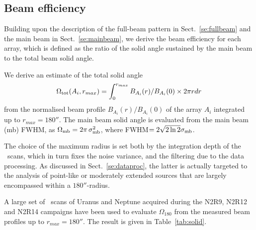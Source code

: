 \subsection{Beam efficiency}
\label{se:beam_efficiency}

Building upon the description of the full-beam pattern in
Sect.~\ref{se:fullbeam} and the main beam in Sect.~\ref{se:mainbeam},
we derive the beam efficiency for each array, which is defined as the
ratio of the solid angle sustained by the main beam to the total beam
solid angle.

We derive an estimate of the total solid angle
\begin{equation}
  \Omega_{\rm{tot}} (A_i, r_{max}) = \int_0^{r_{max}} B_{A_i}(r)/B_{A_i}(0) \times 2 \pi r dr
  \label{eq:omega_tot}
\end{equation}
from the normalised beam profile $B_{A_i}(r)/B_{A_i}(0)$ of the array
$A_i$ integrated up to $r_{max} = 180''$. The main beam solid angle is
evaluated from the main beam (mb) FWHM, as
$\Omega_{\rm{mb}} = 2 \pi\,  \sigma_{\rm{mb}}^2$, where FWHM$ =
2\sqrt{2\ln{2}}\sigma_{\rm{mb}}$. 

The choice of the maximum radius is set both by the integration depth of
the \bm\ scans, which in turn fixes the noise variance, and the
filtering due to the data processing. {\lp As discussed in
Sect.~\ref{se:dataproc}, the latter is actually targeted to the analysis of
point-like or moderately extended sources that are largely encompassed
within a $180''$-radius.}

A large set of \bm\ scans of Uranus and Neptune acquired during the
N2R9, N2R12 and N2R14 campaigns have been used to evaluate
{\lp $\Omega_{180}$} from the measured beam profiles up to
$r_{max} =180''$. %
The result is given in Table~\ref{tab:solid}.

